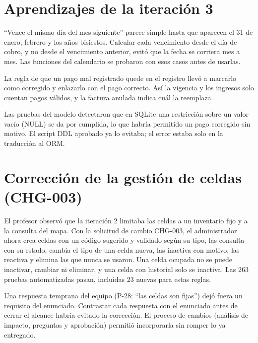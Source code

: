 \section{Aprendizajes de la iteración 3}
\begin{description}[style=nextline]
  \item[Las fechas de calendario necesitan reglas explícitas] ``Vence el mismo día del mes siguiente'' parece simple hasta que aparecen el 31 de enero, febrero y los años bisiestos. Calcular cada vencimiento desde el día de cobro, y no desde el vencimiento anterior, evitó que la fecha se corriera mes a mes. Las funciones del calendario se probaron con esos casos antes de usarlas.
  \item[Corregir sin borrar] La regla de que un pago mal registrado quede en el registro llevó a marcarlo como corregido y enlazarlo con el pago correcto. Así la vigencia y los ingresos solo cuentan pagos válidos, y la factura anulada indica cuál la reemplaza.
  \item[Las pruebas también revisan la base de datos] Las pruebas del modelo detectaron que en SQLite una restricción sobre un valor vacío (NULL) se da por cumplida, lo que habría permitido un pago corregido sin motivo. El script DDL aprobado ya lo evitaba; el error estaba solo en la traducción al ORM.
\end{description}

\section{Corrección de la gestión de celdas (CHG-003)}
El profesor observó que la iteración 2 limitaba las celdas a un inventario fijo y a la consulta del mapa. Con la solicitud de cambio CHG-003, el administrador ahora crea celdas con un código sugerido y validado según su tipo, las consulta con su estado, cambia el tipo de una celda nueva, las inactiva con motivo, las reactiva y elimina las que nunca se usaron. Una celda ocupada no se puede inactivar, cambiar ni eliminar, y una celda con historial solo se inactiva. Las 263 pruebas automatizadas pasan, incluidas 23 nuevas para estas reglas.

\begin{description}[style=nextline]
  \item[Aprendizaje] Una respuesta temprana del equipo (P-28: ``las celdas son fijas'') dejó fuera un requisito del enunciado. Contrastar cada respuesta con el enunciado antes de cerrar el alcance habría evitado la corrección. El proceso de cambios (análisis de impacto, preguntas y aprobación) permitió incorporarla sin romper lo ya entregado.
\end{description}

